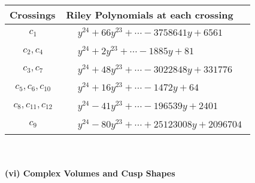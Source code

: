 \documentclass[1p]{elsarticle_modified}
\theoremstyle{definition}
\begin{document}
\begin{tabular}{m{50pt}|m{274pt}}
Crossings & \hspace{64pt}Riley Polynomials at each crossing \\
\hline $$\begin{aligned}c_{1}\end{aligned}$$&$\begin{aligned}
&y^{24}+66 y^{23}+\cdots-3758641 y+6561
\end{aligned}$\\
\hline $$\begin{aligned}c_{2},c_{4}\end{aligned}$$&$\begin{aligned}
&y^{24}+2 y^{23}+\cdots-1885 y+81
\end{aligned}$\\
\hline $$\begin{aligned}c_{3},c_{7}\end{aligned}$$&$\begin{aligned}
&y^{24}+48 y^{23}+\cdots-3022848 y+331776
\end{aligned}$\\
\hline $$\begin{aligned}c_{5},c_{6},c_{10}\end{aligned}$$&$\begin{aligned}
&y^{24}+16 y^{23}+\cdots-1472 y+64
\end{aligned}$\\
\hline $$\begin{aligned}c_{8},c_{11},c_{12}\end{aligned}$$&$\begin{aligned}
&y^{24}-41 y^{23}+\cdots-196539 y+2401
\end{aligned}$\\
\hline $$\begin{aligned}c_{9}\end{aligned}$$&$\begin{aligned}
&y^{24}-80 y^{23}+\cdots+25123008 y+2096704
\end{aligned}$\\
\hline
\end{tabular}\\~\\
\newpage\flushleft \textbf{(vi) Complex Volumes and Cusp Shapes}
\end{document}
